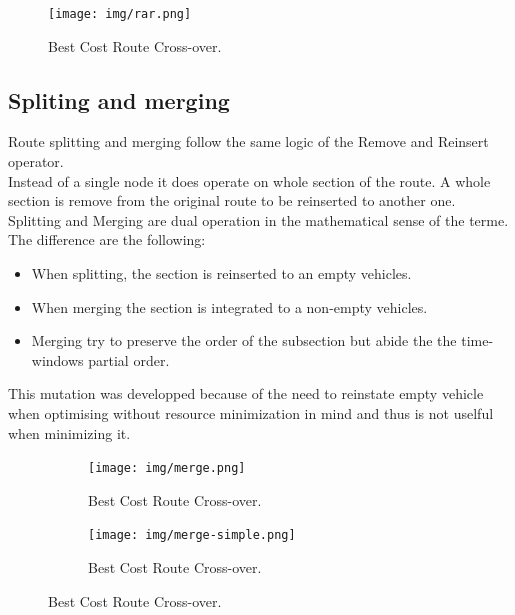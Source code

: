 \documentclass[12pt]{memoir}
\begin{document}
\begin{figure}[htbp]
	\begin{center}
		\texttt{[image: img/rar.png]}
		\caption{Best Cost Route Cross-over.}
	\end{center}
\end{figure}

\subsection{Spliting and merging}
Route splitting and merging follow the same logic of the Remove and Reinsert operator.\\ 
Instead of a single node it does operate on whole section of the route. A whole section
 is remove from the original route to be reinserted to another one. Splitting and Merging are 
dual operation in the mathematical sense of the terme.\\
The difference are the following:
\begin{itemize}
  \item When splitting, the section is reinserted to an empty vehicles.
  \item When merging the section is integrated to a non-empty vehicles.
  \item Merging try to preserve the order of the subsection but abide the the time-windows partial order.
\end{itemize}
This mutation was developped because of the need to reinstate empty vehicle when optimising without
 resource minimization in mind and thus is not uselful when minimizing it. 

\begin{figure}[htbp]
\centering
	\begin{subfigure}{.5\textwidth}
                        \centering
			\texttt{[image: img/merge.png]}
			\caption{Best Cost Route Cross-over.}
	
	\end{subfigure}%
	\begin{subfigure}{.5\textwidth}
                        \centering
			\texttt{[image: img/merge-simple.png]}
			\caption{Best Cost Route Cross-over.}

	\end{subfigure}
\end{figure}
\end{document}
